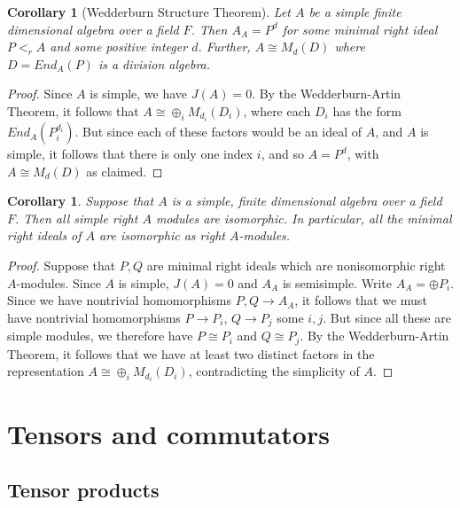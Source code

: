 \documentclass[12pt]{report}
\theoremstyle{plain}
\newtheorem{cor}[thm]{Corollary}
\begin{document}
\begin{cor}[Wedderburn Structure Theorem]
Let $A$ be a simple finite dimensional algebra over a field $F$. Then $A_A
= P^d$ for some minimal right ideal $P <_r A$ and some positive integer $d$.
Further, $A
\cong M_d(D)$ where $D = End_A(P)$ is a division algebra.
\end{cor}
\begin{proof}
Since $A$ is simple, we have $J(A) = 0$. By the Wedderburn-Artin Theorem,
it follows that $A \cong \oplus_i M_{d_i}(D_i)$, where each $D_i$ has the
form $End_A(P_i^{d_i})$. But since each of these factors would be an ideal
of $A$, and $A$ is simple, it follows that there is only one index $i$, and
so $A = P^d$, with $A \cong M_d(D)$ as claimed.
\end{proof}

\begin{cor} \label{simple wedderburn}
Suppose that $A$ is a simple, finite dimensional algebra over a field $F$.
Then all simple right $A$ modules are isomorphic. In particular, all the
minimal right ideals of $A$ are isomorphic as right $A$-modules.
\end{cor}
\begin{proof}
Suppose that $P, Q$ are minimal right ideals which are nonisomorphic right
$A$-modules.  Since $A$ is simple, $J(A) = 0$ and $A_A$ is semisimple.
Write $A_A = \oplus P_i$. Since we have nontrivial homomorphisms $P, Q \to
A_A$, it follows that we must have nontrivial homomorphisms $P \to P_i$,
$Q \to P_j$ some $i, j$. But since all these are simple modules, we
therefore have $P \cong P_i$ and $Q \cong P_j$. By the Wedderburn-Artin
Theorem, it follows that we have at least two distinct factors in the
representation $A \cong \oplus_i M_{d_i}(D_i)$, contradicting the
simplicity of $A$.
\end{proof}


\appendix

\chapter{Tensors and commutators}

\section{Tensor products}
\end{document}
